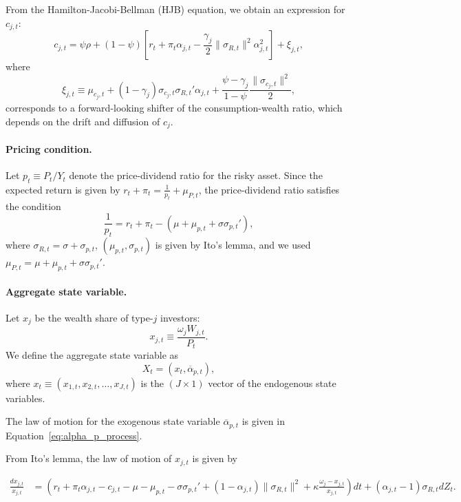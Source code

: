 From the Hamilton-Jacobi-Bellman (HJB) equation, we obtain an expression for $c_{j,t}$:
\begin{equation}\label{eq:xi_j}
	c_{j,t} = \psi \rho + (1-\psi) \left[ r_t + \pi_t \alpha_{j,t} - \frac{\gamma_j}{2} \|\sigma_{R,t}\|^2 \alpha_{j,t}^2\right] + \xi_{j,t},
\end{equation}
where 
\begin{equation}\label{eq:shifter}
	\xi_{j,t} \equiv \mu_{c_j,t} + (1-\gamma_j)  \sigma_{c_j,t} \sigma_{R,t}' \alpha_{j,t} + \frac{\psi - \gamma_j}{1-\psi} \frac{\|\sigma_{c_j,t}\|^2}{2},
\end{equation} corresponds to a forward-looking shifter of the consumption-wealth ratio, which depends on the drift and diffusion of $c_j$.

\paragraph{Pricing condition.} Let $p_t \equiv P_t/Y_t$ denote the price-dividend ratio for the risky asset. Since the expected return is given by $r_t + \pi_t = \frac{1}{p_t} + \mu_{P,t}$, the price-dividend ratio satisfies the condition
\begin{equation}\label{eq:pricing_cond}
	\frac{1}{p_t} = r_t + \pi_t  -(\mu + \mu_{p,t} + \sigma \sigma_{p,t}'),
\end{equation}
where $\sigma_{R,t} = \sigma + \sigma_{p,t}$, $(\mu_{p,t}, \sigma_{p,t})$ is given by Ito's lemma, and we used $\mu_{P,t} =\mu + \mu_{p,t} + \sigma \sigma_{p,t}' $.

\paragraph{Aggregate state variable.} Let $x_j$ be the wealth share of type-$j$ investors:
\begin{equation}
	x_{j,t} \equiv \frac{\omega_j W_{j,t}}{P_t}.\nonumber
\end{equation}
We define the aggregate state variable as 
\begin{equation}\label{eq:agg-state-var}
	X_t = (x_t, \overline{\alpha}_{p,t}), 
\end{equation}
where $x_t \equiv \left(x_{1,t}, x_{2,t}, \ldots, x_{J,t}\right )$ is the $(J\times 1)$ vector of the endogenous state variables.

The law of motion for the exogenous state variable $\overline{\alpha}_{p,t}$ is given in Equation~\eqref{eq:alpha_p_process}.


From Ito's lemma, the law of motion of $x_{j,t}$ is given by
\begin{small}
	\begin{align*}
		\frac{d x_{j,t}}{x_{j,t}} &= \left( r_t + \pi_t \alpha_{j,t} - c_{j,t} -\mu - \mu_{p,t} - \sigma \sigma_{p,t}'  +(1- \alpha_{j,t}) \|\sigma_{R,t}\|^2  +\kappa \frac{\omega_j-x_{j,t}}{x_{j,t}}  \right) dt + \left (\alpha_{j,t} - 1\right ) \sigma_{R,t} d Z_t.
	\end{align*}
\end{small}


